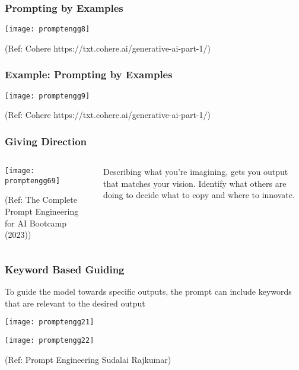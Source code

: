 \begin{frame}[fragile]\frametitle{Prompting by Examples}

\begin{center}
\texttt{[image: promptengg8]}

{\tiny (Ref: Cohere https://txt.cohere.ai/generative-ai-part-1/)}

\end{center}		
		


\end{frame}

\begin{frame}[fragile]\frametitle{Example: Prompting by Examples}

\begin{center}
\texttt{[image: promptengg9]}

{\tiny (Ref: Cohere https://txt.cohere.ai/generative-ai-part-1/)}

\end{center}		
		
\end{frame}

\begin{frame}[fragile]\frametitle{Giving Direction}

\begin{columns}
    \begin{column}[T]{0.6\linewidth}
		\begin{center}
		\texttt{[image: promptengg69]}

		{\tiny (Ref: The Complete Prompt Engineering for AI Bootcamp (2023))}
		\end{center}	
    \end{column}
    \begin{column}[T]{0.4\linewidth}
		Describing what you’re imagining, gets you output that matches your vision.
		Identify what others are doing to decide what to copy and where to innovate.
    \end{column}
  \end{columns}
\end{frame}

\begin{frame}[fragile]\frametitle{ Keyword Based Guiding}

To guide the model towards specific outputs, the prompt can include 
keywords that are relevant to the desired output

\begin{center}
\texttt{[image: promptengg21]}

\texttt{[image: promptengg22]}

{\tiny (Ref: Prompt Engineering Sudalai Rajkumar)}

\end{center}		
	
\end{frame}

